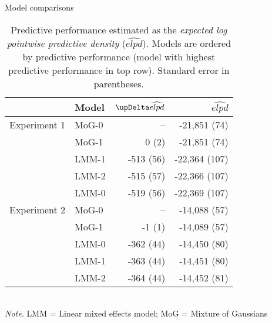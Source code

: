 \begin{frame}{Model comparisons}
\begin{scriptsize}
\begin{table}[ht]
\centering
	\caption{\scriptsize{Predictive performance estimated as the \textit{expected log pointwise predictive density} ($\widehat{elpd}$). Models are ordered by predictive performance (model with highest predictive performance in top row)}. Standard error in parentheses.}
\begin{tabular}{rlrr}
  \toprule
 & Model & $\updel\widehat{elpd}$ & $\widehat{elpd}$ \\ 
  \midrule
Experiment 1 & MoG-0 & -- & -21,851 (74) \\ 
   \rowcolor{yellow!40!white}& MoG-1 & 0 (2) & -21,851 (74) \\ 
   \rowcolor{yellow!40!white}& LMM-1 & -513 (56) & -22,364 (107) \\ 
   & LMM-2 & -515 (57) & -22,366 (107) \\ 
   & LMM-0 & -519 (56) & -22,369 (107) \\ 
   \midrule
Experiment 2 & MoG-0 & -- & -14,088 (57) \\ 
   \rowcolor{yellow!40!white}& MoG-1 & -1 (1) & -14,089 (57) \\ 
   & LMM-0 & -362 (44) & -14,450 (80) \\ 
   \rowcolor{yellow!40!white}& LMM-1 & -363 (44) & -14,451 (80) \\ 
   & LMM-2 & -364 (44) & -14,452 (81) \\ 
		\bottomrule
		\end{tabular}\\
		\textit{Note.} LMM = Linear mixed effects model; MoG = Mixture of Gaussians 
		\end{table}
\end{scriptsize}
\end{frame}